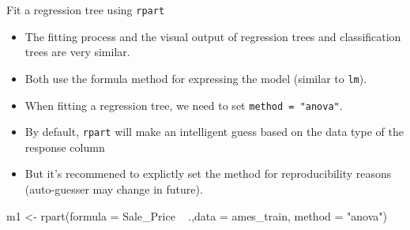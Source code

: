 \documentclass[
  10pt,
  ignorenonframetext,
]{beamer}
\newenvironment{Shaded}{}{}
\newcommand{\DataTypeTok}[1]{#1}
\newcommand{\KeywordTok}[1]{\textcolor[rgb]{0.00,0.00,1.00}{#1}}
\newcommand{\NormalTok}[1]{#1}
\newcommand{\OperatorTok}[1]{#1}
\newcommand{\StringTok}[1]{\textcolor[rgb]{0.00,0.50,0.50}{#1}}
\providecommand{\tightlist}{%
  \setlength{\itemsep}{0pt}\setlength{\parskip}{0pt}}
\begin{document}
\begin{frame}[fragile]{Fit a regression tree using \texttt{rpart}}
\protect\hypertarget{fit-a-regression-tree-using-rpart}{}

\begin{itemize}
\tightlist
\item
  The fitting process and the visual output of regression trees and
  classification trees are very similar.
\item
  Both use the formula method for expressing the model (similar to
  \texttt{lm}).
\item
  When fitting a regression tree, we need to set
  \texttt{method\ =\ "anova"}.
\item
  By default, \texttt{rpart} will make an intelligent guess based on the
  data type of the response column
\item
  But it's recommened to explictly set the method for reproducibility
  reasons (auto-guesser may change in future).
\end{itemize}

\begin{Shaded}
\begin{Highlighting}[]
\NormalTok{m1 <-}\StringTok{ }\KeywordTok{rpart}\NormalTok{(}\DataTypeTok{formula =}\NormalTok{ Sale_Price }\OperatorTok{~}\StringTok{ }\NormalTok{.,}\DataTypeTok{data =}\NormalTok{ ames_train,}
            \DataTypeTok{method  =} \StringTok{"anova"}\NormalTok{)}
\end{Highlighting}
\end{Shaded}

\end{frame}
\end{document}
